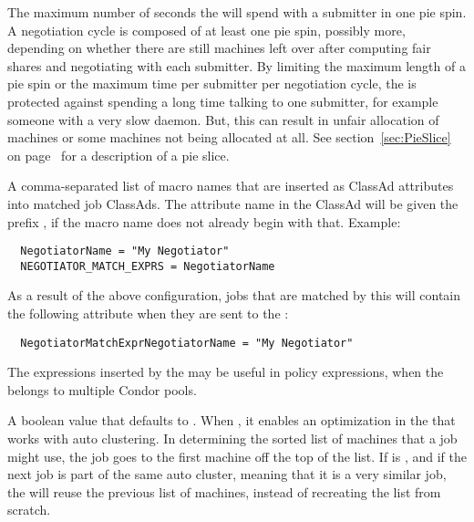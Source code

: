 \begin{description}
\label{param:NegotiatorMaxTimePerPieSpin}
\item[\Macro{NEGOTIATOR\_MAX\_TIME\_PER\_PIESPIN}]
  The maximum number of seconds the
   will spend with a submitter in one pie spin.
  A negotiation cycle is composed of at least one pie spin, possibly more,
  depending on whether there are still machines left over after
  computing fair shares and negotiating with each submitter.  By
  limiting the maximum length of a pie spin or the maximum time per
  submitter per negotiation cycle, the  is protected
  against spending a long time talking to one submitter, for example someone
  with a very slow  daemon.
  But, this can result in unfair allocation of
  machines or some machines not being allocated at all.
  See section~\ref{sec:PieSlice} on page~\pageref{sec:PieSlice}
  for a description of a pie slice.

\label{param:NegotiatorMatchExprs}
\item[\Macro{NEGOTIATOR\_MATCH\_EXPRS}]
  A comma-separated list of macro names that are inserted as
  ClassAd attributes into matched job ClassAds.
  The attribute name in the ClassAd will be given the prefix
  , 
  if the macro name does not already begin with that.
  Example:

\footnotesize
\begin{verbatim}
  NegotiatorName = "My Negotiator"
  NEGOTIATOR_MATCH_EXPRS = NegotiatorName
\end{verbatim}
\normalsize

  As a result of the above configuration, jobs that are matched by this
   will contain the following attribute when they are 
  sent to the :

\footnotesize
\begin{verbatim}
  NegotiatorMatchExprNegotiatorName = "My Negotiator"
\end{verbatim}
\normalsize

  The expressions inserted by the  may be useful in 
   policy expressions,
  when the  belongs to multiple Condor pools.

\label{param:NegotiatorMatchlistCaching}
\item[\Macro{NEGOTIATOR\_MATCHLIST\_CACHING}]
  A boolean value that defaults to .
  When , it enables an optimization in the 
  that works with auto clustering.
  In determining the sorted list of machines that a job might use,
  the job goes to the first machine off the top of the list. 
  If  is ,
  and if the next job is part of the same auto cluster,
  meaning that it is a very similar job,
  the  will reuse the previous list of machines,
  instead of recreating the list from scratch.


\end{description}
